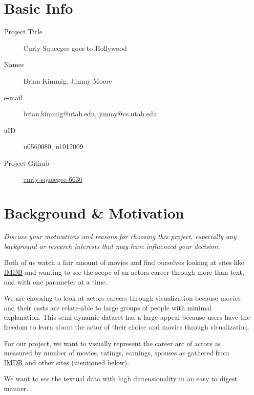 \documentclass[12pt]{article}
\begin{document}
\section{Basic Info}
\begin{description}
    \item [Project Title]  Curly Squeegee goes to Hollywood 
    \item [Names]  Brian Kimmig, Jimmy Moore
    \item[e-mail] brian.kimmig@utah.edu, jimmy@cs.utah.edu
    \item [uID] u0560080, u1012009
    \item [Project Github] \href{https://github.com/bkimmig/curly-squeegee-6630}{curly-squeegee-6630}
\end{description}


\section{Background \& Motivation}
\textit{Discuss your motivations and reasons for choosing this project, especially any background or research interests that may have influenced your decision.}

Both of us watch a fair amount of movies and find ourselves looking at sites like \href{www.imdb.com}{IMDB} and wanting to see the scope of an actors career through more than text, and with one parameter at a time.

We are choosing to look at actors careers through visualization because movies and their casts are relate-able to large groups of people with minimal explanation. This semi-dynamic dataset has a large appeal because users have the freedom to learn about the actor of their choice and movies through visualization. 

For our project, we want to visually represent the career arc of actors as measured by number of movies, ratings, earnings, spouses as gathered from \href{www.imdb.com}{IMDB} and other sites (mentioned below). 

We want to see the textual data with high dimensionality in an easy to digest manner.  
\end{document}
